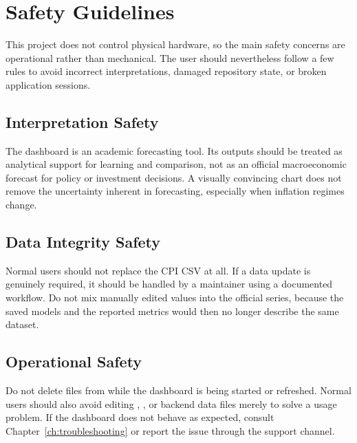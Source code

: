 %
%

\chapter{Safety Guidelines}

This project does not control physical hardware, so the main safety concerns are operational rather than mechanical. The user should nevertheless follow a few rules to avoid incorrect interpretations, damaged repository state, or broken application sessions.

\section{Interpretation Safety}

The dashboard is an academic forecasting tool. Its outputs should be treated as analytical support for learning and comparison, not as an official macroeconomic forecast for policy or investment decisions. A visually convincing chart does not remove the uncertainty inherent in forecasting, especially when inflation regimes change.

\section{Data Integrity Safety}

Normal users should not replace the CPI CSV at all. If a data update is genuinely required, it should be handled by a maintainer using a documented workflow. Do not mix manually edited values into the official series, because the saved models and the reported metrics would then no longer describe the same dataset.

\section{Operational Safety}

Do not delete files from  while the dashboard is being started or refreshed. Normal users should also avoid editing , , or backend data files merely to solve a usage problem. If the dashboard does not behave as expected, consult Chapter~\ref{ch:troubleshooting} or report the issue through the support channel.

